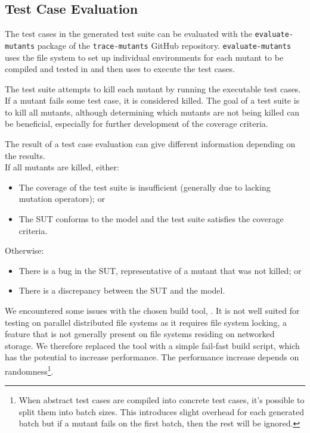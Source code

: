 \documentclass{article}
\begin{document}
		\subsection{Test Case Evaluation}
			\label{sec:method_testing}
			The test cases in the generated test suite can be evaluated with the \texttt{evaluate-mutants} package of the \texttt{trace-mutants} GitHub repository. \texttt{evaluate-mutants} uses the file system to set up individual environments for each mutant to be compiled and tested in and then uses \citeauthor{sbt} to execute the test cases.

			The test suite attempts to kill each mutant by running the executable test cases. If a mutant fails some test case, it is considered killed. The goal of a test suite is to kill all mutants, although determining which mutants are not being killed can be beneficial, especially for further development of the coverage criteria.

			The result of a test case evaluation can give different information depending on the results. \\
			If all mutants are killed, either:
				\begin{itemize}
					\item The coverage of the test suite is insufficient (generally due to lacking mutation operators); or
					\item The SUT conforms to the model and the test suite satisfies the coverage criteria.
				\end{itemize}
			Otherwise:
				\begin{itemize}
					\item There is a bug in the SUT, representative of a mutant that was not killed; or
					\item There is a discrepancy between the SUT and the model.
				\end{itemize}

		We encountered some issues with the chosen build tool, \citeauthor{sbt}. It is not well suited for testing on parallel distributed file systems as it requires file system locking, a feature that is not generally present on file systems residing on networked storage. We therefore replaced the tool with a simple fail-fast build script, which has the potential to increase performance. The performance increase depends on randomness\footnote{When abstract test cases are compiled into concrete test cases, it's possible to split them into batch sizes. This introduces slight overhead for each generated batch but if a mutant fails on the first batch, then the rest will be ignored.}.
\end{document}
